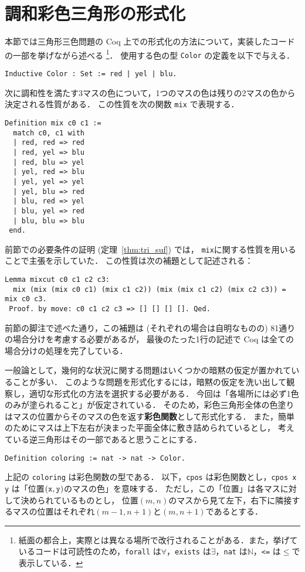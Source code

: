 \section{調和彩色三角形の形式化}

本節では三角形三色問題の Coq 上での形式化の方法について，実装したコードの一部を挙げながら述べる
\footnote{紙面の都合上，実際とは異なる場所で改行されることがある．また，挙げているコードは可読性のため，{\tt forall} は$\forall$，{\tt exists} は$\exists$，{\tt nat} は$\mathbb{N}$，{\tt <=} は$\leq$で表示している．}．
使用する色の型 {\tt Color} の定義を以下で与える．
\begin{lstlisting}[language=Coq]
 Inductive Color : Set := red | yel | blu.
\end{lstlisting}

次に調和性を満たす3マスの色について，1つのマスの色は残りの2マスの色から決定される性質がある．
この性質を次の関数 {\tt mix} で表現する．
\begin{lstlisting}[language=Coq]
 Definition mix c0 c1 :=
  match c0, c1 with
  | red, red => red
  | red, yel => blu
  | red, blu => yel
  | yel, red => blu
  | yel, yel => yel
  | yel, blu => red
  | blu, red => yel
  | blu, yel => red
  | blu, blu => blu
 end.
\end{lstlisting}

前節での必要条件の証明 (定理~\ref{thm:tri_suf}) では，
{\tt mix}に関する性質を用いることで主張を示していた．
この性質は次の補題として記述される：
\begin{lstlisting}[language=Coq]
 Lemma mixcut c0 c1 c2 c3:
  mix (mix (mix c0 c1) (mix c1 c2)) (mix (mix c1 c2) (mix c2 c3)) = mix c0 c3.
 Proof. by move: c0 c1 c2 c3 => [] [] [] []. Qed.
\end{lstlisting}
前節の脚注で述べた通り，この補題は (それぞれの場合は自明なものの) 81通りの場合分けを考慮する必要があるが，
最後のたった1行の記述で Coq は全ての場合分けの処理を完了している．

一般論として，幾何的な状況に関する問題はいくつかの暗黙の仮定が置かれていることが多い．
このような問題を形式化するには，暗黙の仮定を洗い出して観察し，適切な形式化の方法を選択する必要がある．
今回は「各場所には必ず1色のみが塗られること」が仮定されている．
そのため，彩色三角形全体の色塗りはマスの位置からそのマスの色を返す{\bf 彩色関数}として形式化する．
また，簡単のためにマスは上下左右が決まった平面全体に敷き詰められているとし，
考えている逆三角形はその一部であると思うことにする．
\begin{lstlisting}[language=Coq]
 Definition coloring := nat -> nat -> Color.
\end{lstlisting}
上記の {\tt coloring} は彩色関数の型である．
以下，{\tt cpos} は彩色関数とし，{\tt cpos x y} は「位置$({\tt x},{\tt y})$のマスの色」を意味する．
ただし，この「位置」は各マスに対して決められているものとし，
位置$(m,n)$のマスから見て左下，右下に隣接するマスの位置はそれぞれ$(m-1,n+1)$と$(m,n+1)$であるとする．

